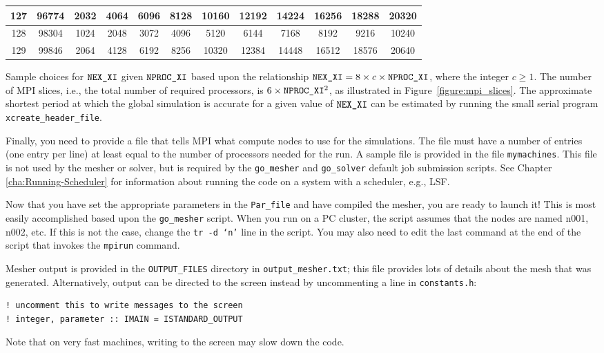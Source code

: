 \begin{center}
\begin{longtable}{|c|c|c|c|c|c|c|c|c|c|c|c|}
\hline
127 & 96774 & 2032 & 4064 & 6096 & 8128 & 10160 & 12192 & 14224 & 16256 & 18288 & 20320\tabularnewline
\hline
128 & 98304 & 1024 & 2048 & 3072 & 4096 & 5120 & 6144 & 7168 & 8192 & 9216 & 10240\tabularnewline
\hline
129 & 99846 & 2064 & 4128 & 6192 & 8256 & 10320 & 12384 & 14448 & 16512 & 18576 & 20640\tabularnewline
\hline
\end{longtable}
%
\begin{table}[h]
\caption{Sample choices for $\nexxi$ given $\nprocxi$ based upon the relationship
$\nexxi=8\times c\times\nprocxi$, where the integer $c\ge1$. The
number of MPI slices, i.e., the total number of required processors,
is $6\times\nprocxi^{2}$, as illustrated in Figure~\ref{figure:mpi_slices}.
The approximate shortest period at which the global simulation is
accurate for a given value of $\nexxi$ can be estimated by running
the small serial program \texttt{xcreate\_header\_file}.}
\end{table}
\end{center}

Finally, you need to provide a file that tells MPI what compute nodes
to use for the simulations. The file must have a number of entries
(one entry per line) at least equal to the number of processors needed
for the run. A sample file is provided in the file \texttt{mymachines}.
This file is not used by the mesher or solver, but is required by
the \texttt{go\_mesher} and \texttt{go\_solver} default job submission
scripts. See Chapter \ref{cha:Running-Scheduler} for information
about running the code on a system with a scheduler, e.g., LSF.

Now that you have set the appropriate parameters in the \texttt{Par\_file}
and have compiled the mesher, you are ready to launch it! This is
most easily accomplished based upon the \texttt{go\_mesher} script.
When you run on a PC cluster, the script assumes that the nodes are
named n001, n002, etc. If this is not the case, change the \texttt{tr
-d `n'} line in the script. You may also need to edit the last command
at the end of the script that invokes the \texttt{mpirun} command.

Mesher output is provided in the \texttt{OUTPUT\_FILES} directory
in \texttt{output\_mesher.txt}; this file provides lots of details
about the mesh that was generated. Alternatively, output can be directed
to the screen instead by uncommenting a line in \texttt{constants.h}:
\begin{verbatim}
! uncomment this to write messages to the screen
! integer, parameter :: IMAIN = ISTANDARD_OUTPUT
\end{verbatim}
Note that on very fast machines, writing to the screen may slow down
the code.

